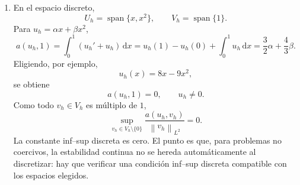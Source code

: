 \documentclass[11pt]{article}
\newcommand{\norm}[1]{\left\lVert #1\right\rVert}
\def\dx{\mbox{\(\,\mathrm{d}x\)}}
\begin{document}
\begin{enumerate}[label=\textbf{\arabic*.}, leftmargin=*]
\begin{enumerate}[label=(\alph*)]
        \item En el espacio discreto,
        \[
            U_h=\operatorname{span}\{x,x^2\},
            \qquad
            V_h=\operatorname{span}\{1\}.
        \]
        Para $u_h=\alpha x+\beta x^2$,
        \[
            a(u_h,1)
            =
            \int_0^1(u_h'+u_h)\dx
            =
            u_h(1)-u_h(0)+\int_0^1u_h\dx
            =
            \frac32\alpha+\frac43\beta.
        \]
        Eligiendo, por ejemplo,
        \[
            u_h(x)=8x-9x^2,
        \]
        se obtiene
        \[
            a(u_h,1)=0,
            \qquad
            u_h\neq0.
        \]
        Como todo $v_h\in V_h$ es múltiplo de $1$,
        \[
            \sup_{v_h\in V_h\setminus\{0\}}
            \frac{a(u_h,v_h)}{\norm{v_h}_{L^2}}
            =
            0.
        \]
        La constante inf--sup discreta es cero. El punto es que, para problemas no coercivos, la estabilidad continua no se hereda automáticamente al discretizar: hay que verificar una condición inf--sup discreta compatible con los espacios elegidos.
    \end{enumerate}

\end{enumerate}
\end{document}
